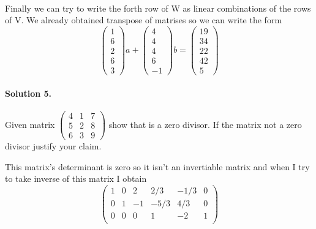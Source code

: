 \documentclass[11pt]{article}
\begin{document}
\paragraph{}Finally we can try to write the forth row of W as linear combinations of the rows of V. We already obtained transpose of matrises so we can write the form
\[
\begin{pmatrix}
1\\
6\\
2\\
6\\
3
\end{pmatrix}a
+
\begin{pmatrix}
4\\
4\\
4\\
6\\
-1
\end{pmatrix}b
=
\begin{pmatrix}
19\\
34\\
22\\
42\\
5
\end{pmatrix}
\]
\paragraph{Solution 5.}Given matrix
$
\begin{pmatrix}
4&1&7\\
5&2&8\\
6&3&9
\end{pmatrix}
$
show that is a zero divisor. If the matrix not a zero divisor justify your claim.

This matrix's determinant is zero so it isn't an invertiable matrix and when I try to take inverse of this matrix I obtain 
\[
\left(\begin{array}{ccc|ccc}  
	1 & 0 & 2 & 2/3 & -1/3 & 0 \\
    0 & 1 & -1 & -5/3 & 4/3 & 0 \\
    0 & 0 & 0 & 1 & -2 & 1  \\
\end{array}\right)
\]
\end{document}
